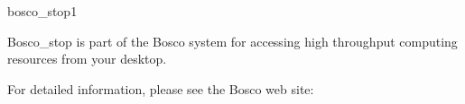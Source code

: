 \begin{ManPage}{\label{man-bosco-stop}bosco\_stop}{1}
{Bosco\_stop is part of the Bosco system for accessing high
throughput computing resources from your desktop.

For detailed information, please see the Bosco web site:
}


\end{ManPage}

